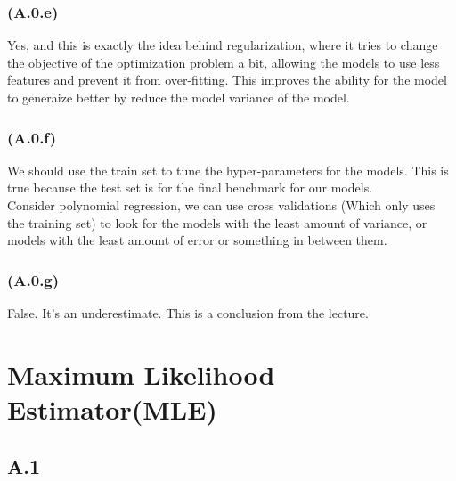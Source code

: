\documentclass[]{article}
\begin{document}
        \subsubsection*{(A.0.e)}
            Yes, and this is exactly the idea behind regularization, where it tries to change the objective of the optimization problem a bit, allowing the models to use less features and prevent it from over-fitting. This improves the ability for the model to generaize better by reduce the model variance of the model. 
        \subsubsection*{(A.0.f)}
            We should use the train set to tune the hyper-parameters for the models. This is true because the test set is for the final benchmark for our models. 
            \\
            Consider polynomial regression, we can use cross validations (Which only uses the training set) to look for the models with the least amount of variance, or models with the least amount of error or something in between them. 
        \subsubsection*{(A.0.g)}
            False. It's an underestimate. This is a conclusion from the lecture. 

\section*{Maximum Likelihood Estimator(MLE)}
    \subsection*{A.1}
\end{document}
